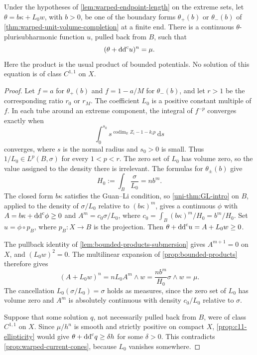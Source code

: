 \begin{proposition}\label{prop:warped-continuous-endpoint-equation}
Under the hypotheses of \cref{lem:warped-endpoint-length} on the extreme sets, let $\theta=b\kappa+L_0w$, with $b>0$, be one of the boundary forms $\theta_+(b)$ or $\theta_-(b)$ of \cref{thm:warped-unit-volume-completion} at a finite end. There is a continuous $\theta$-plurisubharmonic function $u$, pulled back from $B$, such that
\begin{equation}\label{eq:warped-continuous-endpoint-equation}
 (\theta+\mathrm{dd}^{\mathrm{c}} u)^n=\mu.
\end{equation}
Here the product is the usual product of bounded potentials. No solution of this equation is of class $C^{1,1}$ on $X$.
\end{proposition}
\begin{proof}
Let $f=a$ for $\theta_+(b)$ and $f=1-a/M$ for $\theta_-(b)$, and let $r>1$ be the corresponding ratio $r_0$ or $r_M$. The coefficient $L_0$ is a positive constant multiple of $f$. In each tube around an extreme component, the integral of $f^{-p}$ converges exactly when
\[
 \int_0^{s_0}s^{\operatorname{codim}_{\mathbb R}Z_i-1-k_ip}\,\mathrm{d}s
\]
converges, where $s$ is the normal radius and $s_0>0$ is small. Thus $1/L_0\in L^p(B,\sigma)$ for every $1<p<r$. The zero set of $L_0$ has volume zero, so the value assigned to the density there is irrelevant. The formulas for $\theta_\pm(b)$ give
\[
 H_0:=\int_B\frac{\sigma}{L_0}=nb^m.
\]
The closed form $b\kappa$ satisfies the Guan--Li condition, so \cref{uni-thm:GL-intro} on $B$, applied to the density of $\sigma/L_0$ relative to $(b\kappa)^m$, gives a continuous $\phi$ with $A=b\kappa+\mathrm{dd}^{\mathrm{c}}\phi\geq0$ and $A^m=c_0\sigma/L_0$, where $c_0=\int_B(b\kappa)^m/H_0=b^m/H_0$. Set $u=\phi\circ p_B$, where $p_B\colon X\to B$ is the projection. Then $\theta+\mathrm{dd}^{\mathrm{c}} u=A+L_0w\geq0$.

The pullback identity of \cref{lem:bounded-products-submersion} gives $A^{m+1}=0$ on $X$, and $(L_0w)^2=0$. The multilinear expansion of \cref{prop:bounded-products} therefore gives
\[
 (A+L_0w)^n=nL_0 A^m\wedge w
       =\frac{nb^m}{H_0}\sigma\wedge w=\mu.
\]
The cancellation $L_0(\sigma/L_0)=\sigma$ holds as measures, since the zero set of $L_0$ has volume zero and $A^m$ is absolutely continuous with density $c_0/L_0$ relative to $\sigma$.

Suppose that some solution $q$, not necessarily pulled back from $B$, were of class $C^{1,1}$ on $X$. Since $\mu/h^n$ is smooth and strictly positive on compact $X$, \cref{prop:c11-ellipticity} would give $\theta+\mathrm{dd}^{\mathrm{c}} q\geq\delta h$ for some $\delta>0$. This contradicts \cref{prop:warped-current-cones}, because $L_0$ vanishes somewhere.
\end{proof}


